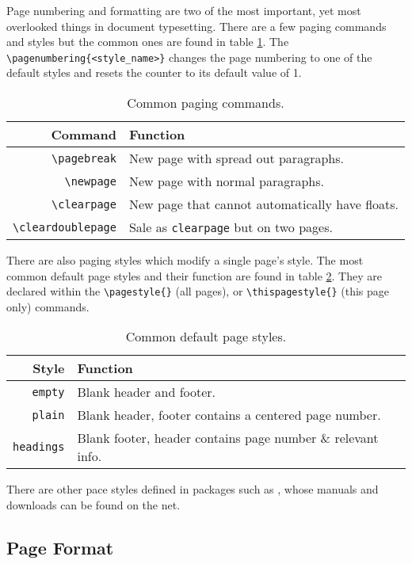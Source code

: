 Page numbering and formatting are two of the most important, yet most
overlooked things in document typesetting.  There are a few paging
commands and styles but the common ones are found in table
\ref{t:page}.  The \verb|\pagenumbering{<style_name>}| changes the
page numbering to one of the default styles and resets the counter to
its default value of 1.
\begin{table}[!htbp]
    \centering
    \caption{Common paging commands.}
    \label{t:page}
    \begin{tabular}{rl}
        \toprule
        Command & Function \\
        \midrule
        \verb|\pagebreak| & New page with spread out paragraphs. \\
        \verb|\newpage| & New page with normal paragraphs. \\
        \verb|\clearpage| & New page that cannot automatically have floats. \\
        \verb|\cleardoublepage| & Sale as \verb|clearpage| but on two pages. \\
        \bottomrule
    \end{tabular}
\end{table}

There are also paging styles which modify a single page's style.  The
most common default page styles and their function are found in table
\ref{t:pagestyle}.  They are declared within the \verb|\pagestyle{}|
(all pages), or \verb|\thispagestyle{}| (this page only) commands.
\begin{table}[!htbp]
    \centering
    \caption{Common default page styles.}
    \label{t:pagestyle}
    \begin{tabular}{rl}
        \toprule
        Style & Function \\
        \midrule
        \verb|empty| & Blank header and footer. \\
        \verb|plain| & Blank header, footer contains a centered page number.\\
        \verb|headings| & Blank footer, header contains page number \& relevant info. \\
        \bottomrule
    \end{tabular}
\end{table}

%
There are other pace styles defined in packages such as
, whose manuals and downloads can be found on the net.

\subsection{Page Format}
%


